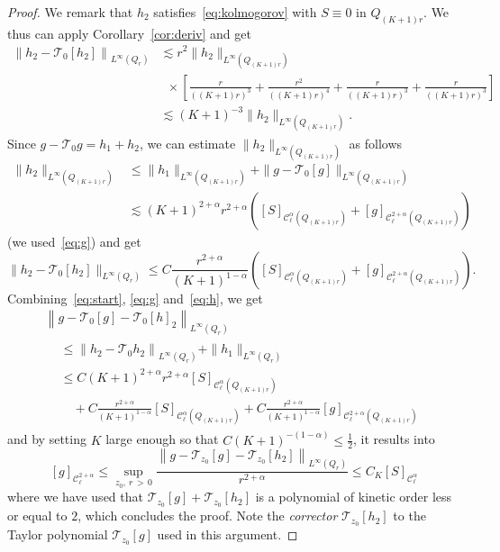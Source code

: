 \documentclass[10pt]{amsart}
\theoremstyle{definition}\newtheorem{defi}[theo]{Definition}\newtheorem{rema}[theo]{Remark}\newtheorem{exam}[theo]{Example}\newtheorem{exem}[theo]{Example}\newtheorem{nota}[theo]{Notation}
\newcommand{\cC}{\mathcal{C}}
\newcommand{\cT}{\mathcal{T}}
\begin{document}
\begin{proof}
We remark that $h_2$ satisfies~\eqref{eq:kolmogorov} with $S\equiv 0$ in $Q_{(K+1)r}$. We thus can apply Corollary~\ref{cor:deriv} and get
\begin{align*}
\left\|h_2 - \cT_{0}[h_2]\right\|_{L^\infty(Q_r)} & \lesssim r^2 \|h_2\|_{L^\infty\left(Q_{(K+1)r}\right)}  \\
& \;\:\times \left[\frac{r}{((K+1)r)^3} + \frac{r^2}{((K+1)r)^4}+\frac{r}{((K+1)r)^3}+\frac{r}{((K+1)r)^3}\right]
\\
& \lesssim (K+1)^{-3} \|h_2\|_{L^\infty\left(Q_{(K+1)r}\right)}.
\end{align*}
Since $g-\cT_{0} g = h_1 +h_2$, we can estimate $\|h_2\|_{L^\infty(Q_{(K+1)r})}$ as follows
\begin{align*}
\|h_2\|_{L^\infty\left(Q_{(K+1)r}\right)} &\le \|h_1\|_{L^\infty\left(Q_{(K+1)r}\right)} + \|g - \cT_{0}[g] \|_{L^\infty\left(Q_{(K+1)r}\right)} \\
& \lesssim (K+1)^{2+\alpha} r^{2+\alpha} \left([S]_{\cC_\ell^{\alpha}\left(Q_{(K+1)r}\right)} + [g]_{\cC_\ell^{2+\alpha}\left(Q_{(K+1)r}\right)} \right)
\end{align*}
(we used~\eqref{eq:g}) and get
\begin{equation}\label{eq:h}
\|h_2 -\cT_{0}[h_2]\|_{L^\infty(Q_r)} \le C
\frac{r^{2+\alpha}}{(K+1)^{1-\alpha}}
\left([S]_{\cC_\ell^{\alpha}\left(Q_{(K+1)r}\right)} + [g]_{\cC_\ell^{2+\alpha}\left(Q_{(K+1)r}\right)}\right).
\end{equation}
Combining~\eqref{eq:start}, \eqref{eq:g} and~\eqref{eq:h}, we get
\begin{multline*}
\left\| g - \cT_{0}[g] - \cT_{0} [h]_2 \right\|_{L^\infty(Q_r)} \\
\begin{aligned}
& \le \left\| h_2 - \cT_{0} h_2 \right\|_{L^\infty(Q_r)} + \| h_1\|_{L^\infty(Q_r)} \\
& \le C (K+1)^{2+\alpha} r^{2+\alpha} [S]_{\cC_\ell^{\alpha}\left(Q_{(K+1)r}\right)} \\
& \quad + C \frac{r^{2+\alpha}}{(K+1)^{1-\alpha}} [S]_{\cC_\ell^{\alpha}\left(Q_{(K+1)r}\right)} + C \frac{r^{2+\alpha}}{(K+1)^{1-\alpha}} [g]_{\cC_\ell^{2+\alpha}\left(Q_{(K+1)r}\right)}
\end{aligned}
\end{multline*}
and by setting $K$ large enough so that $C (K+1)^{-(1-\alpha)} \le \frac12$, it results into
\[
[g]_{\cC_\ell^{2+\alpha}} \le \sup_{z_0,\:r\,>\,0} \frac{ \left\| g -
\cT_{z_0}[g] - \cT_{z_0}[h_2]
\right\|_{L^\infty(Q_r)}}{r^{2+\alpha}} \le C_K [S]_{\cC_\ell^{\alpha}}
\]
where we have used that $\cT_{z_0}[g] + \cT_{z_0}[h_2]$ is a polynomial of kinetic order less or equal to $2$, which concludes the proof. Note the \emph{corrector} $\cT_{z_0}[h_2]$ to the Taylor polynomial $\cT_{z_0}[g]$ used in this argument.
\end{proof}
\end{document}
